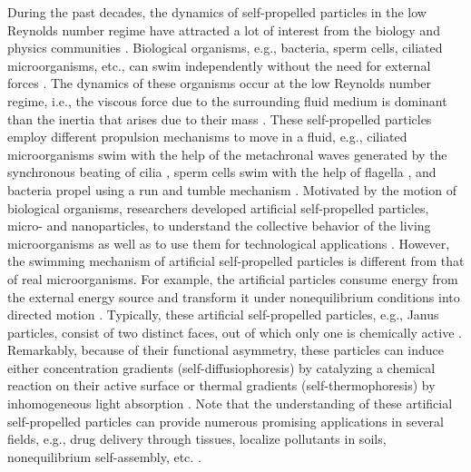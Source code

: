 \documentclass[aps,pre,preprint,superscriptaddress,amsmath,amssymb,nofootinbib]{revtex4}
\begin{document}
During the past decades, the dynamics of self-propelled particles in the low Reynolds number regime have attracted a lot of interest from the biology and physics communities \cite{Ramaswamy_ARCMP, Cates_RPP, Ebeling_EPJST, Lowen_RMP}.
Biological organisms, e.g., bacteria, sperm cells, ciliated microorganisms, etc., can swim independently without the need for external forces \cite{Brown_Nature, Berg_Nature, Goldstein_PRL,Howard_Sc, Woolley_Reproduction, friedrich}. 
The dynamics of these organisms occur at the low Reynolds number regime, i.e., the viscous force due to the surrounding fluid medium is dominant than the inertia that arises due to their mass \cite{purcell}. 
These self-propelled particles employ different propulsion mechanisms to move in a fluid, e.g., ciliated microorganisms swim with the help of the metachronal waves generated by the synchronous beating of cilia \cite{lighthill, blake}, sperm cells swim with the help of flagella \cite{friedrich}, and bacteria propel using a run and tumble mechanism \cite{patteson}. 
Motivated by the motion of biological organisms, researchers developed artificial self-propelled particles, micro- and nanoparticles, to understand the collective behavior of the living microorganisms as well as to use them for technological applications 
\cite{Jiang_Book, Muller_CR}. 
However, the swimming mechanism of artificial self-propelled particles is different from that of real microorganisms.
For example, the artificial particles consume energy from the external  energy source and transform it under nonequilibrium conditions into directed motion \cite{Ramaswamy_ARCMP}.
Typically, these artificial self-propelled particles, e.g., Janus particles, consist of two distinct faces, out of which only one is chemically active \cite{Howse_PRL}.
Remarkably, because of their functional asymmetry, these particles can induce either concentration gradients (self-diffusiophoresis) by catalyzing a chemical reaction on their active surface \cite{Howse_PRL, Paxton, Gibbs_APL, Volpe_SM} or thermal gradients (self-thermophoresis) by inhomogeneous light absorption \cite{Sano_PRL}. 
Note that the understanding of these artificial self-propelled particles can provide numerous promising applications in several fields, e.g., drug delivery through tissues, localize pollutants in soils, nonequilibrium self-assembly, etc. \cite{Weibel_PNAS, Chin_Lab, Yang_SM}.  
\end{document}
